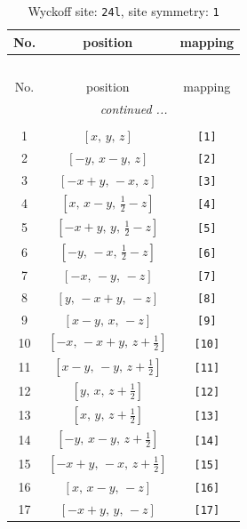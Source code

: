 \documentclass[fleqn,8pt]{jsarticle}
\begin{document}
\begin{longtable}{ccc}
\caption{Wyckoff site: {\tt 24l}, site symmetry: {\tt 1}}
 \\
 \hline \hline
No. & position & mapping \\ \hline \endfirsthead

\multicolumn{2}{l}{\tablename\ \thetable{}} \\
 \hline \hline
No. & position & mapping \\ \hline \endhead

 \hline \hline
\multicolumn{2}{r}{\footnotesize\it continued ...} \\ \endfoot

 \hline \hline
\multicolumn{2}{r}{} \\ \endlastfoot

1 & $\left[ x,\, y,\, z \right]$ & {\tt [1]} \\ \hline
2 & $\left[ - y,\, x - y,\, z \right]$ & {\tt [2]} \\ \hline
3 & $\left[ - x + y,\, - x,\, z \right]$ & {\tt [3]} \\ \hline
4 & $\left[ x,\, x - y,\, \frac{1}{2} - z \right]$ & {\tt [4]} \\ \hline
5 & $\left[ - x + y,\, y,\, \frac{1}{2} - z \right]$ & {\tt [5]} \\ \hline
6 & $\left[ - y,\, - x,\, \frac{1}{2} - z \right]$ & {\tt [6]} \\ \hline
7 & $\left[ - x,\, - y,\, - z \right]$ & {\tt [7]} \\ \hline
8 & $\left[ y,\, - x + y,\, - z \right]$ & {\tt [8]} \\ \hline
9 & $\left[ x - y,\, x,\, - z \right]$ & {\tt [9]} \\ \hline
10 & $\left[ - x,\, - x + y,\, z + \frac{1}{2} \right]$ & {\tt [10]} \\ \hline
11 & $\left[ x - y,\, - y,\, z + \frac{1}{2} \right]$ & {\tt [11]} \\ \hline
12 & $\left[ y,\, x,\, z + \frac{1}{2} \right]$ & {\tt [12]} \\ \hline
13 & $\left[ x,\, y,\, z + \frac{1}{2} \right]$ & {\tt [13]} \\ \hline
14 & $\left[ - y,\, x - y,\, z + \frac{1}{2} \right]$ & {\tt [14]} \\ \hline
15 & $\left[ - x + y,\, - x,\, z + \frac{1}{2} \right]$ & {\tt [15]} \\ \hline
16 & $\left[ x,\, x - y,\, - z \right]$ & {\tt [16]} \\ \hline
17 & $\left[ - x + y,\, y,\, - z \right]$ & {\tt [17]} \\ \hline

\end{longtable}
\end{document}
